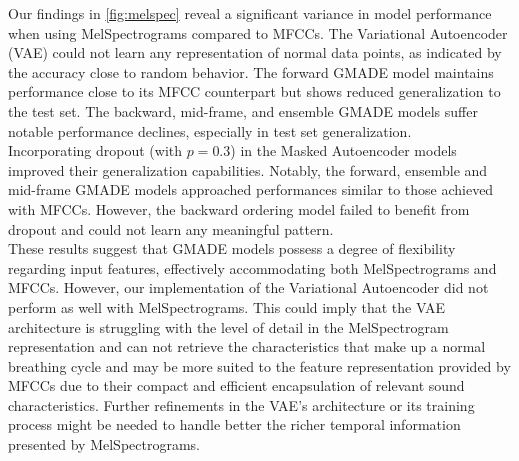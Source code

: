 Our findings in \autoref{fig:melspec} reveal a significant variance in model performance when using MelSpectrograms compared to MFCCs. The Variational Autoencoder (VAE) could not learn any representation of normal data points, as indicated by the accuracy close to random behavior. The forward GMADE model maintains performance close to its MFCC counterpart but shows reduced generalization to the test set. The backward, mid-frame, and ensemble GMADE models suffer notable performance declines, especially in test set generalization.\\
Incorporating dropout (with $p=0.3$) in the Masked Autoencoder models improved their generalization capabilities. Notably, the forward, ensemble and mid-frame GMADE models approached performances similar to those achieved with MFCCs. However, the backward ordering model failed to benefit from dropout and could not learn any meaningful pattern.\\
These results suggest that GMADE models possess a degree of flexibility regarding input features, effectively accommodating both MelSpectrograms and MFCCs. However, our implementation of the Variational Autoencoder did not perform as well with MelSpectrograms. This could imply that the VAE architecture is struggling with the level of detail in the MelSpectrogram representation and can not retrieve the characteristics that make up a normal breathing cycle and may be more suited to the feature representation provided by MFCCs due to their compact and efficient encapsulation of relevant sound characteristics. Further refinements in the VAE's architecture or its training process might be needed to handle better the richer temporal information presented by MelSpectrograms.

